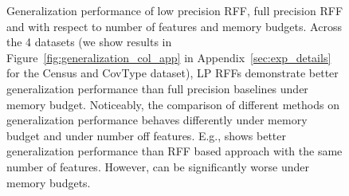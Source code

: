 \begin{figure}
\begin{tabular}{c@{\hskip 0in}c@{\hskip 0in}c@{\hskip 0in}c}
	\end{tabular}
	\caption{Generalization performance of low precision RFF, full precision RFF and \Nystrom with respect to number of features and memory budgets. Across the 4 datasets (we show results in Figure~\ref{fig:generalization_col_app} in Appendix~\ref{sec:exp_details} for the Census and CovType dataset), LP RFFs demonstrate better generalization performance than full precision baselines under memory budget. Noticeably, the comparison of different methods on generalization performance behaves differently under memory budget and under number off features. E.g., \Nystrom shows better generalization performance than RFF based approach with the same number of features. However, \Nystrom can be significantly worse under memory budgets.}
	\label{fig:generalization_col}
\end{figure}



